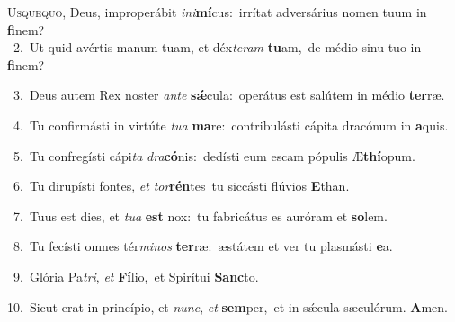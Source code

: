 \lettrine{\initial\textcolor{\initialcolor}{U}}{squequo,} Deus, improperábit \textit{in}\-\textit{i}\textbf{mí}cus:~\star irrítat adversárius nomen tuum in \textbf{fi}\-nem?\\
{\numbfont\textcolor{\numbcolor}{~2.}}~Ut quid avértis manum tuam, et déx\-\textit{te}\-\textit{ram} \textbf{tu}\-am,~\star de médio sinu tuo in \textbf{fi}\-nem?\par
{\numbfont\textcolor{\numbcolor}{~3.}}~Deus autem Rex noster \textit{an}\-\textit{te} \textbf{sǽ}\-cula:~\star operátus est salútem in médio \textbf{ter}\-ræ.\par
{\numbfont\textcolor{\numbcolor}{~4.}}~Tu confirmásti in virtúte \textit{tu}\-\textit{a} \textbf{ma}\-re:~\star contribulásti cápita dracónum in \textbf{a}\-quis.\par
{\numbfont\textcolor{\numbcolor}{~5.}}~Tu confregísti cápi\textit{ta} \textit{dra}\-\textbf{có}nis:~\star dedísti eum escam pópulis Æ\-\textbf{thí}\-opum.\par
{\numbfont\textcolor{\numbcolor}{~6.}}~Tu dirupísti fontes, \textit{et} \textit{tor}\-\textbf{rén}tes~\star tu siccásti flúvios \textbf{E}\-than.\par
{\numbfont\textcolor{\numbcolor}{~7.}}~Tuus est dies, et \textit{tu}\-\textit{a} \textbf{est} nox:~\star tu fabricátus es auróram et \textbf{so}\-lem.\par
{\numbfont\textcolor{\numbcolor}{~8.}}~Tu fecísti omnes tér\-\textit{mi}\-\textit{nos} \textbf{ter}\-ræ:~\star æstátem et ver tu plasmásti \textbf{e}\-a.\par
{\numbfont\textcolor{\numbcolor}{~9.}}~Glória Pa\-\textit{tri}\-, \textit{et} \textbf{Fí}\-lio,~\star et Spirítui \textbf{Sanc}\-to.\par
{\numbfont\textcolor{\numbcolor}{10.}}~Sicut erat in princípio, et \textit{nunc}\-, \textit{et} \textbf{sem}\-per,~\star et in sǽcula sæculórum. \textbf{A}\-men.\par
